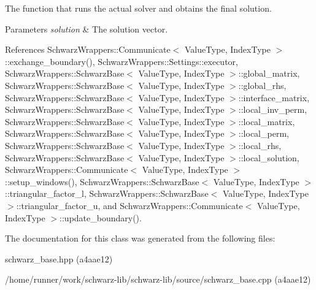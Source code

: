 The function that runs the actual solver and obtains the final solution. 


\begin{DoxyParams}{Parameters}
{\em solution} & The solution vector. \\
\hline
\end{DoxyParams}


References Schwarz\+Wrappers\+::\+Communicate$<$ Value\+Type, Index\+Type $>$\+::exchange\+\_\+boundary(), Schwarz\+Wrappers\+::\+Settings\+::executor, Schwarz\+Wrappers\+::\+Schwarz\+Base$<$ Value\+Type, Index\+Type $>$\+::global\+\_\+matrix, Schwarz\+Wrappers\+::\+Schwarz\+Base$<$ Value\+Type, Index\+Type $>$\+::global\+\_\+rhs, Schwarz\+Wrappers\+::\+Schwarz\+Base$<$ Value\+Type, Index\+Type $>$\+::interface\+\_\+matrix, Schwarz\+Wrappers\+::\+Schwarz\+Base$<$ Value\+Type, Index\+Type $>$\+::local\+\_\+inv\+\_\+perm, Schwarz\+Wrappers\+::\+Schwarz\+Base$<$ Value\+Type, Index\+Type $>$\+::local\+\_\+matrix, Schwarz\+Wrappers\+::\+Schwarz\+Base$<$ Value\+Type, Index\+Type $>$\+::local\+\_\+perm, Schwarz\+Wrappers\+::\+Schwarz\+Base$<$ Value\+Type, Index\+Type $>$\+::local\+\_\+rhs, Schwarz\+Wrappers\+::\+Schwarz\+Base$<$ Value\+Type, Index\+Type $>$\+::local\+\_\+solution, Schwarz\+Wrappers\+::\+Communicate$<$ Value\+Type, Index\+Type $>$\+::setup\+\_\+windows(), Schwarz\+Wrappers\+::\+Schwarz\+Base$<$ Value\+Type, Index\+Type $>$\+::triangular\+\_\+factor\+\_\+l, Schwarz\+Wrappers\+::\+Schwarz\+Base$<$ Value\+Type, Index\+Type $>$\+::triangular\+\_\+factor\+\_\+u, and Schwarz\+Wrappers\+::\+Communicate$<$ Value\+Type, Index\+Type $>$\+::update\+\_\+boundary().



The documentation for this class was generated from the following files\+:\begin{DoxyCompactItemize}
\item 
schwarz\+\_\+base.\+hpp (a4aae12)\item 
/home/runner/work/schwarz-\/lib/schwarz-\/lib/source/schwarz\+\_\+base.\+cpp (a4aae12)\end{DoxyCompactItemize}
